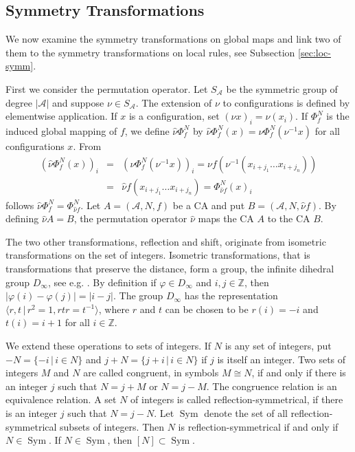 \documentclass[a4paper]{article}
\newcommand{\Sym}{\mathop{\mathrm{Sym}}}
\begin{document}
\subsection{Symmetry Transformations}
We now examine the symmetry transformations on global maps and link two of them to the
symmetry transformations on local rules, see  Subsection \ref{sec:loc-symm}.

First we consider the permutation operator.
Let $S_\mathcal{A}$ be the symmetric group of degree $|\mathcal{A}|$
and suppose $\nu \in S_\mathcal{A}$.
The extension of $\nu$ to configurations is defined by elementwise application.
If $x$ is a configuration, set $(\nu x)_i = \nu (x_i)$.
If $\Phi^N_f$ is the induced global mapping of $f$, we define
$\hat{\nu} \Phi^N_f$ by
$\hat{\nu} \Phi^N_f (x) = \nu \Phi^N_f (\nu^{-1} x)$ for all configurations $x$.
From
\begin{eqnarray*}
\left( \hat{\nu} \Phi^N_f(x) \right)_{i}
& = & \left( \nu \Phi^N_f (\nu^{-1} x) \right)_{i}
= \nu f \left(\nu^{-1}(x_{i+j_1} \ldots x_{i+j_{n}}) \right) \\
& = & \hat{\nu} f(x_{i+j_1} \ldots x_{i+j_{n}})
 =  \Phi^N_{\hat{\nu} f} (x)_{i}
\end{eqnarray*}
follows $\hat{\nu} \Phi^N_f =  \Phi^N_{\hat{\nu} f}$.
Let $A = (\mathcal{A}, N, f)$ be a CA and put $B = (\mathcal{A}, N, \hat{\nu} f)$.
By defining $\hat{\nu} A = B$, the permutation operator $\hat{\nu}$ maps the CA $A$ to the CA $B$.

The two other transformations, reflection and shift, originate from isometric transformations on the set of integers.
Isometric transformations, that is transformations that preserve the distance, form a group,
the infinite dihedral group $D_\infty$, see e.g. \cite{armstrong1997groups}.
By definition if $\varphi \in D_\infty$ and $i,j \in \mathbb{Z}$,
then $|\varphi(i) - \varphi(j)| = |i - j|$.
The group $D_\infty$ has the representation $\langle r, t \, | \, r^2=1, rtr = t^{-1} \rangle$,
where $r$ and $t$ can be chosen to be $r(i) = -i$ and $t(i) = i+1$ for all $i \in \mathbb{Z}$.

We extend these operations to sets of integers.
If $N$ is any set of integers, put $-N = \{-i \, | \, i \in N \}$ and
$j + N = \{ j + i \, | \, i \in N \}$ if $j$ is itself an integer.
Two sets of integers $M$ and $N$ are called congruent, in symbols $M \cong N$,  if and only if
there is an integer $j$ such that $N = j + M $ or $N = j - M$.
The congruence relation is an equivalence relation.
A set $N$ of integers is called reflection-symmetrical, if
there is an integer $j$ such that $N = j - N$.
Let $\Sym$ denote the set of all reflection-symmetrical subsets of integers.
Then $N$ is reflection-symmetrical if and only if $N \in \Sym$.
If $N \in \Sym$, then $[N] \subset \Sym$.
\end{document}
